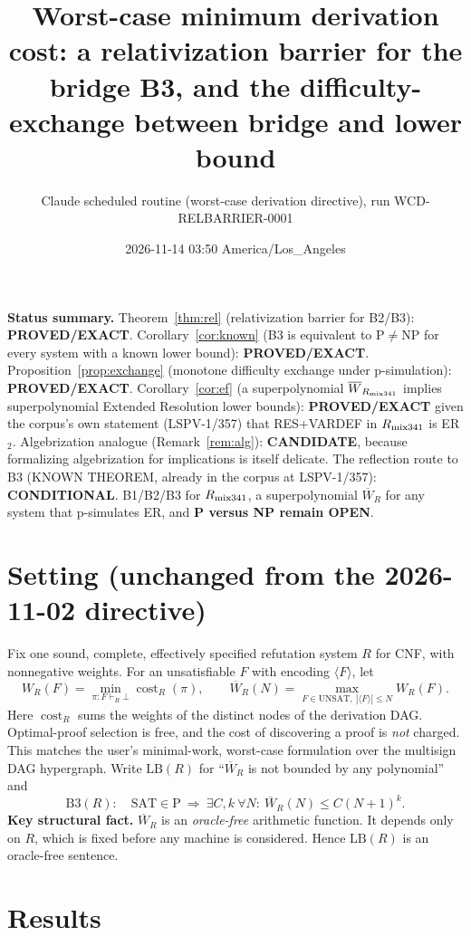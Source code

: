 \documentclass[11pt]{article}
\title{Worst-case minimum derivation cost: a relativization barrier for the bridge B3, and the difficulty-exchange between bridge and lower bound}
\author{Claude scheduled routine (worst-case derivation directive), run WCD-RELBARRIER-0001}
\date{2026-11-14 03:50 America/Los\_Angeles}
\newcommand{\Wb}{\overline W}
\begin{document}
\maketitle

\noindent\textbf{Status summary.}
Theorem~\ref{thm:rel} (relativization barrier for B2/B3): \textbf{PROVED/EXACT}.
Corollary~\ref{cor:known} (B3 is equivalent to P$\neq$NP for every system with a known lower bound): \textbf{PROVED/EXACT}.
Proposition~\ref{prop:exchange} (monotone difficulty exchange under p-simulation): \textbf{PROVED/EXACT}.
Corollary~\ref{cor:ef} (a superpolynomial $\Wb_{R_{\rm mix341}}$ implies superpolynomial Extended Resolution lower bounds): \textbf{PROVED/EXACT} given the corpus's own statement (LSPV-1/357) that RES+VARDEF in $R_{\rm mix341}$ is ER$_2$.
Algebrization analogue (Remark~\ref{rem:alg}): \textbf{CANDIDATE}, because formalizing algebrization for implications is itself delicate.
The reflection route to B3 (KNOWN THEOREM, already in the corpus at LSPV-1/357): \textbf{CONDITIONAL}.
B1/B2/B3 for $R_{\rm mix341}$, a superpolynomial $\Wb_R$ for any system that p-simulates ER, and \textbf{P versus NP remain OPEN}.

\section{Setting (unchanged from the 2026-11-02 directive)}
Fix one sound, complete, effectively specified refutation system $R$ for CNF, with nonnegative weights. For an unsatisfiable $F$ with encoding $\langle F\rangle$, let
\[
W_R(F)=\min_{\pi:F\vdash_R\bot}\operatorname{cost}_R(\pi),\qquad
\Wb_R(N)=\max_{F\in\mathrm{UNSAT},\ |\langle F\rangle|\le N}W_R(F).
\]
Here $\operatorname{cost}_R$ sums the weights of the distinct nodes of the derivation DAG. Optimal-proof selection is free, and the cost of discovering a proof is \emph{not} charged. This matches the user's minimal-work, worst-case formulation over the multisign DAG hypergraph. Write $\mathrm{LB}(R)$ for ``$\Wb_R$ is not bounded by any polynomial'' and
\[
\mathrm{B3}(R):\quad \mathrm{SAT}\in\mathrm P\ \Longrightarrow\ \exists C,k\ \forall N:\ \Wb_R(N)\le C(N+1)^k .
\]
\textbf{Key structural fact.} $\Wb_R$ is an \emph{oracle-free} arithmetic function. It depends only on $R$, which is fixed before any machine is considered. Hence $\mathrm{LB}(R)$ is an oracle-free sentence.

\section{Results}
\end{document}
